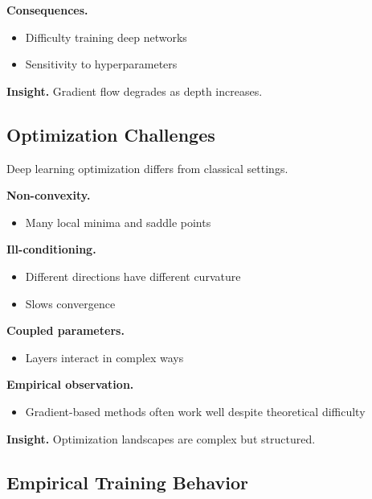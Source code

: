 \noindent
\textbf{Consequences.}
\begin{itemize}
    \item Difficulty training deep networks
    \item Sensitivity to hyperparameters
\end{itemize}

\medskip

\noindent
\textbf{Insight.}  
Gradient flow degrades as depth increases.

\subsection{Optimization Challenges}

Deep learning optimization differs from classical settings.

\medskip

\noindent
\textbf{Non-convexity.}
\begin{itemize}
    \item Many local minima and saddle points
\end{itemize}

\medskip

\noindent
\textbf{Ill-conditioning.}
\begin{itemize}
    \item Different directions have different curvature
    \item Slows convergence
\end{itemize}

\medskip

\noindent
\textbf{Coupled parameters.}
\begin{itemize}
    \item Layers interact in complex ways
\end{itemize}

\medskip

\noindent
\textbf{Empirical observation.}
\begin{itemize}
    \item Gradient-based methods often work well despite theoretical difficulty
\end{itemize}

\medskip

\noindent
\textbf{Insight.}  
Optimization landscapes are complex but structured.

\subsection{Empirical Training Behavior}

